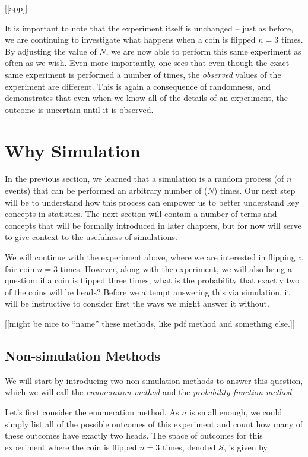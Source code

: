 \documentclass[
]{book}
\theoremstyle{definition}
\theoremstyle{definition}
\theoremstyle{definition}
\theoremstyle{remark}
\begin{document}
{[}{[}app{]}{]}

It is important to note that the experiment itself is unchanged -- just as before, we are continuing to investigate what happens when a coin is flipped \(n = 3\) times. By adjusting the value of \(N\), we are now able to perform this same experiment as often as we wish. Even more importantly, one sees that even though the exact same experiment is performed a number of times, the \emph{observed} values of the experiment are different. This is again a consequence of randomness, and demonstrates that even when we know all of the details of an experiment, the outcome is uncertain until it is observed.

\hypertarget{why-simulation}{%
\section{Why Simulation}\label{why-simulation}}

In the previous section, we learned that a simulation is a random process (of \(n\) events) that can be performed an arbitrary number of (\(N\)) times. Our next step will be to understand how this process can empower us to better understand key concepts in statistics. The next section will contain a number of terms and concepts that will be formally introduced in later chapters, but for now will serve to give context to the usefulness of simulations.

We will continue with the experiment above, where we are interested in flipping a fair coin \(n = 3\) times. However, along with the experiment, we will also bring a question: if a coin is flipped three times, what is the probability that exactly two of the coins will be heads? Before we attempt answering this via simulation, it will be instructive to consider first the ways we might answer it without.

{[}{[}might be nice to ``name'' these methods, like pdf method and something else.{]}{]}

\hypertarget{non-simulation-methods}{%
\subsection{Non-simulation Methods}\label{non-simulation-methods}}

We will start by introducing two non-simulation methods to answer this question, which we will call the \emph{enumeration method} and the \emph{probability function method}

Let's first consider the enumeration method. As \(n\) is small enough, we could simply list all of the possible outcomes of this experiment and count how many of these outcomes have exactly two heads. The space of outcomes for this experiment where the coin is flipped \(n = 3\) times, denoted \(\mathcal{S}\), is given by
\end{document}

